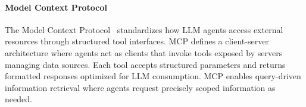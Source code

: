 \paragraph{Model Context Protocol}
The Model Context Protocol~\cite{mcp} standardizes how LLM agents access external resources through structured tool interfaces. MCP defines a client-server architecture where agents act as clients that invoke tools exposed by servers managing data sources. Each tool accepts structured parameters and returns formatted responses optimized for LLM consumption. MCP enables query-driven information retrieval where agents request precisely scoped information as needed. 
